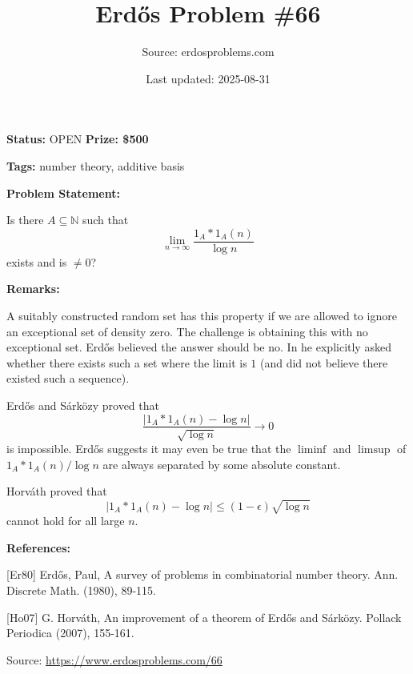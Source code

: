 \documentclass{article}
\title{Erd\H{o}s Problem \#66}
\date{Last updated: 2025-08-31}
\author{Source: erdosproblems.com}
\begin{document}
\maketitle

\noindent\textbf{Status:} OPEN \quad \textbf{Prize: \$500}

\noindent\textbf{Tags:} number theory, additive basis

\medskip
\noindent\textbf{Problem Statement:}

Is there $A\subseteq \mathbb{N}$ such that\[\lim_{n\to \infty}\frac{1_A\ast 1_A(n)}{\log n}\]exists and is $\neq 0$?

\bigskip
\noindent\textbf{Remarks:}

A suitably constructed random set has this property if we are allowed to ignore an exceptional set of density zero. The challenge is obtaining this with no exceptional set. Erd\H{o}s believed the answer should be no. In \cite{Er80} he explicitly asked whether there exists such a set where the limit is $1$ (and did not believe there existed such a sequence).

Erd\H{o}s and S\'{a}rk\"{o}zy proved that\[\frac{\lvert 1_A\ast 1_A(n)-\log n\rvert}{\sqrt{\log n}}\to 0\]is impossible. Erd\H{o}s suggests it may even be true that the $\liminf$ and $\limsup$ of $1_A\ast 1_A(n)/\log n$ are always separated by some absolute constant. 

Horv\'{a}th \cite{Ho07} proved that\[\lvert 1_A\ast 1_A(n)-\log n\rvert \leq (1-\epsilon)\sqrt{\log n}\]cannot hold for all large $n$.

\bigskip
\noindent\textbf{References:}

[Er80] Erd\H{o}s, Paul, A survey of problems in combinatorial number theory. Ann. Discrete Math. (1980), 89-115.
 
 [Ho07] G. Horv\'{a}th, An improvement of a theorem of Erd\H{o}s and S\'{a}rk\"{o}zy. Pollack Periodica (2007), 155-161.

\bigskip
\noindent\small{Source: \url{https://www.erdosproblems.com/66}}
\end{document}
